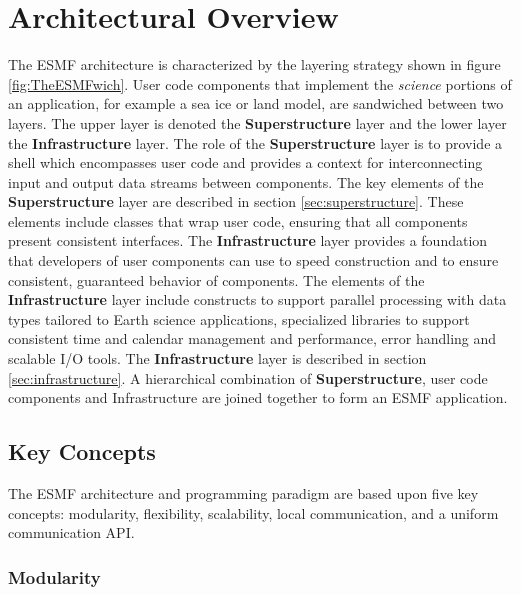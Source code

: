 
\section{Architectural Overview}
\label{sec:ArchOver}
The ESMF architecture is characterized by the layering strategy shown in figure \ref{fig:TheESMFwich}. User code components that implement the {\it science} portions of an application, for example a sea ice or land model, are sandwiched 
between two layers. The upper layer is denoted the {\bf Superstructure} layer 
and the lower layer the {\bf Infrastructure} layer. The role of the {\bf Superstructure} layer is to provide a shell which encompasses user code and provides a context for interconnecting input and output
data streams between components. The key elements of the {\bf Superstructure} layer are described in section \ref{sec:superstructure}.
These elements include classes that wrap user code, ensuring that all
components present consistent interfaces. The {\bf Infrastructure} layer provides a foundation that developers of
user components can use to speed construction and to ensure consistent, guaranteed behavior of components.
The elements of the {\bf Infrastructure} layer include constructs to support parallel processing with data types tailored
to Earth science applications, specialized libraries to support consistent time and calendar management and
performance, error handling and scalable I/O tools. The {\bf Infrastructure} layer is described in section \ref{sec:infrastructure}.
A hierarchical combination of {\bf Superstructure}, user code components and Infrastructure are joined together to form an ESMF application.



\subsection{Key Concepts}

The ESMF architecture and programming paradigm are based upon 
five key concepts:  modularity, flexibility, scalability, local 
communication, and a uniform communication API.  

\subsubsection{Modularity}


